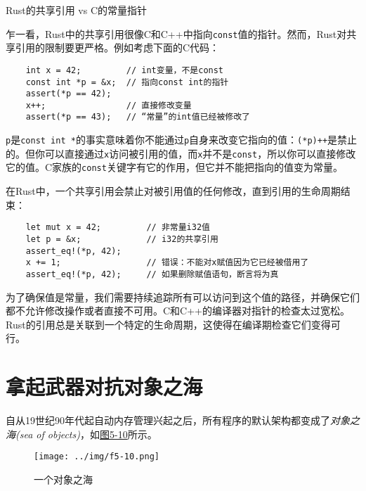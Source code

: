 \begin{shaded}
    \begin{center}
        \Large{Rust的共享引用 vs C的常量指针}
    \end{center}

    乍一看，Rust中的共享引用很像C和C++中指向\texttt{const}值的指针。然而，Rust对共享引用的限制要更严格。例如考虑下面的C代码：
    \begin{verbatim}
    int x = 42;         // int变量，不是const
    const int *p = &x;  // 指向const int的指针
    assert(*p == 42);
    x++;                // 直接修改变量
    assert(*p == 43);   // “常量”的int值已经被修改了
    \end{verbatim}

    \texttt{p}是\texttt{const int *}的事实意味着你不能通过\texttt{p}自身来改变它指向的值：\texttt{(*p)++}是禁止的。但你可以直接通过\texttt{x}访问被引用的值，而\texttt{x}并不是\texttt{const}，所以你可以直接修改它的值。C家族的\texttt{const}关键字有它的作用，但它并不能把指向的值变为常量。

    在Rust中，一个共享引用会禁止对被引用值的任何修改，直到引用的生命周期结束：
    \begin{verbatim}
    let mut x = 42;         // 非常量i32值
    let p = &x;             // i32的共享引用
    assert_eq!(*p, 42);
    x += 1;                 // 错误：不能对x赋值因为它已经被借用了
    assert_eq!(*p, 42);     // 如果删除赋值语句，断言将为真
    \end{verbatim}

    为了确保值是常量，我们需要持续追踪所有可以访问到这个值的路径，并确保它们都不允许修改操作或者直接不可用。C和C++的编译器对指针的检查太过宽松。Rust的引用总是关联到一个特定的生命周期，这使得在编译期检查它们变得可行。
\end{shaded}

\clearpage

\section{拿起武器对抗对象之海}

自从19世纪90年代起自动内存管理兴起之后，所有程序的默认架构都变成了\emph{对象之海(sea of objects)}，如\hyperref[f5-10]{图5-10}所示。

\begin{figure}[htbp]
    \centering
    \texttt{[image: ../img/f5-10.png]}
    \caption{一个对象之海}
    \label{f5-10}
\end{figure}

